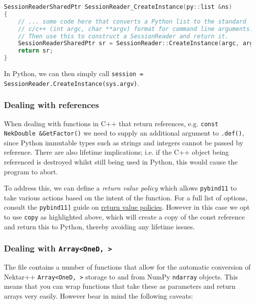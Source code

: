 \begin{lstlisting}[caption={Thin wrapper example}, label={lst:thin_wrapper}, language=C++]
SessionReaderSharedPtr SessionReader_CreateInstance(py::list &ns)
{
    // ... some code here that converts a Python list to the standard
    // c/c++ (int argc, char **argv) format for command line arguments.
    // Then use this to construct a SessionReader and return it.
    SessionReaderSharedPtr sr = SessionReader::CreateInstance(argc, argv);
    return sr;
}
\end{lstlisting}

In Python, we can then simply call \texttt{session = SessionReader.CreateInstance(sys.argv)}.

\subsubsection{Dealing with references}

When dealing with functions in C++ that return references, e.g. \texttt{const
  NekDouble \&GetFactor()} we need to supply an additional argument to
\texttt{.def()}, since Python immutable types such as strings and integers
cannot be passed by reference. There are also lifetime implications; i.e. if the
C++ object being referenced is destroyed whilst still being used in Python, this
would cause the program to abort.

To address this, we can define a \emph{return value policy} which allows
\texttt{pybind11} to take various actions based on the intent of the
function. For a full list of options, consult the \texttt{pybind11]} guide on
\href{https://pybind11.readthedocs.io/en/stable/advanced/functions.html#return-value-policies}{return
  value policies}. However in this case we opt to use \texttt{copy} as
highlighted above, which will create a copy of the const reference and return
this to Python, thereby avoiding any lifetime issues.

\subsubsection{Dealing with \texttt{Array<OneD, >}}

The  file contains a number
of functions that allow for the automatic conversion of Nektar++
\texttt{Array<OneD, >} storage to and from NumPy \texttt{ndarray} objects. This
means that you can wrap functions that take these as parameters and return
arrays very easily. However bear in mind the following caveats:

